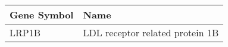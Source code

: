 \begin{tabular}{ll}
\toprule
Gene Symbol &                            Name \\
\midrule
      LRP1B & LDL receptor related protein 1B \\
\bottomrule
\end{tabular}
